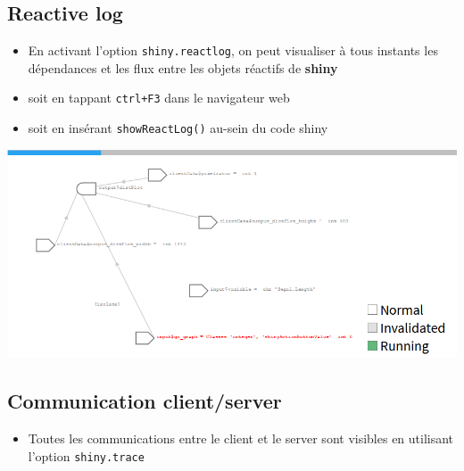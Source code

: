 \documentclass[]{article}
\newenvironment{Shaded}{\begin{snugshade}}{\end{snugshade}}
\newcommand{\KeywordTok}[1]{\textcolor[rgb]{0.13,0.29,0.53}{\textbf{#1}}}
\newcommand{\DataTypeTok}[1]{\textcolor[rgb]{0.13,0.29,0.53}{#1}}
\newcommand{\StringTok}[1]{\textcolor[rgb]{0.31,0.60,0.02}{#1}}
\newcommand{\CommentTok}[1]{\textcolor[rgb]{0.56,0.35,0.01}{\textit{#1}}}
\newcommand{\OtherTok}[1]{\textcolor[rgb]{0.56,0.35,0.01}{#1}}
\newcommand{\OperatorTok}[1]{\textcolor[rgb]{0.81,0.36,0.00}{\textbf{#1}}}
\newcommand{\NormalTok}[1]{#1}
\providecommand{\tightlist}{%
  \setlength{\itemsep}{0pt}\setlength{\parskip}{0pt}}
\begin{document}
\subsection{Reactive log}\label{reactive-log}

\begin{itemize}
\tightlist
\item
  En activant l'option \texttt{shiny.reactlog}, on peut visualiser à
  tous instants les dépendances et les flux entre les objets réactifs de
  \textbf{shiny}
\item
  soit en tappant \texttt{ctrl+F3} dans le navigateur web
\item
  soit en insérant \texttt{showReactLog()} au-sein du code shiny
\end{itemize}

\begin{Shaded}
\end{Shaded}

\includegraphics{img/debug_log.png}

\subsection{Communication
client/server}\label{communication-clientserver}

\begin{itemize}
\tightlist
\item
  Toutes les communications entre le client et le server sont visibles
  en utilisant l'option \texttt{shiny.trace}
\end{itemize}
\end{document}
